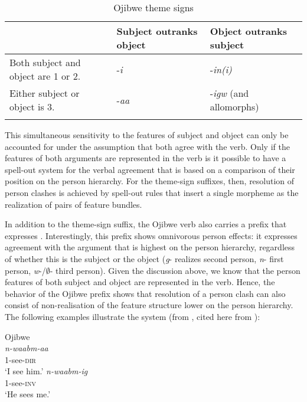 \documentclass[output=paper]{langsci/langscibook}
\begin{document}
\begin{table} 
\caption{Ojibwe theme signs\label{tab:01:4}}
\begin{tabularx}{\textwidth}{Qll} 
\lsptoprule
& Subject outranks object & Object outranks subject \\\midrule
Both subject and object are 1 or 2. & -\textit{i} & -\textit{in(i)}\\
Either subject or object is 3. & -\textit{aa} & -\textit{igw} (and allomorphs)\\
\lspbottomrule
\end{tabularx}
\end{table}
 
This simultaneous sensitivity to the features of subject and object can only be accounted for under the assumption that both agree with the verb. Only if the features of both arguments are represented in the verb is it possible to have a spell-out system for the verbal agreement that is based on a comparison of their position on the person hierarchy. For the theme-sign suffixes, then, resolution of person clashes is achieved by spell-out rules that insert a single morpheme as the realization of pairs of feature bundles.

  In addition to the theme-sign suffix, the Ojibwe verb also carries a prefix that expresses . Interestingly, this prefix shows omnivorous person effects: it expresses agreement with the argument that is highest on the person hierarchy, regardless of whether this is the subject or the object (\textit{g}{}- realizes second person, \textit{n}{}- first person, \textit{w}{}-/${\emptyset}${}- third person). Given the discussion above, we know that the person features of both subject and object are represented in the verb. Hence, the behavior of the Ojibwe prefix shows that resolution of a person clash can also consist of non-realisation of the feature structure lower on the person hierarchy. The following examples illustrate the system (from \citealt{Valentine2001}, cited here from \citealt{Lochbihler2008}):

\ea      Ojibwe\\
 \ea
 \gll  \textit{n-waabm-aa} \\
       \textsc{1}-see-\textsc{dir}    \\
 \glt  ‘I see him.’
\ex
  \gll     \textit{n-waabm-ig}\\
           \textsc{1}-see-\textsc{inv}  \\
  \glt         ‘He sees me.’
\z
 \z
\end{document}
